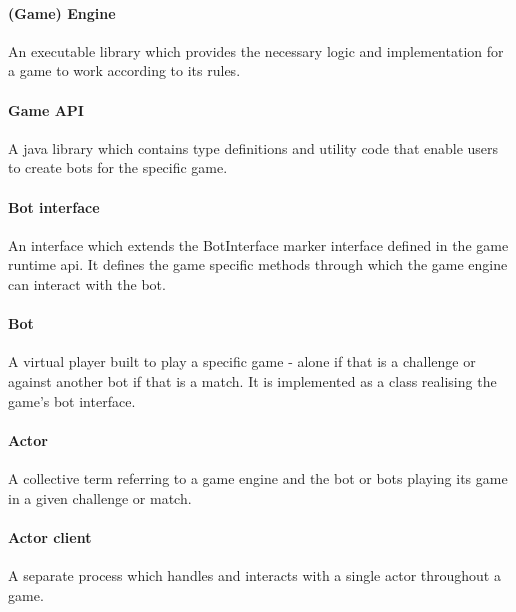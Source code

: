  	\paragraph{(Game) Engine} An executable library which provides the necessary logic and implementation for a game to work according to its rules.   
  
  	\paragraph{Game API} A java library which contains type definitions and utility code that enable users to create bots for the specific game.
  
  	\paragraph{Bot interface} An interface which extends the BotInterface marker interface defined in the game runtime api. It defines the game specific methods through which the game engine can interact with the bot. 
  	
  	\paragraph{Bot} A virtual player built to play a specific game - alone if that is a challenge or against another bot if that is a match. It is implemented as a class realising the game's bot interface.
    	
  	\paragraph{Actor} A collective term referring to a game engine and the bot or bots playing its game in a given challenge or match.
  
  	\paragraph{Actor client} A separate process which handles and interacts with a single actor throughout a game.
  
%